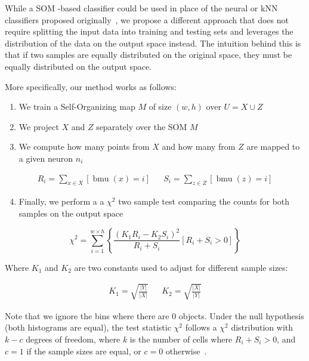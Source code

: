 While a \gls{SOM} -based classifier could be used in place of the neural or \gls{kNN} classifiers proposed
originally~\cite{lopez2016revisiting}, we propose a different approach that does not require
splitting the input data into training and testing sets and leverages the distribution of the
data on the output space instead. The intuition behind this is that if two samples are equally
distributed on the original space, they must be equally distributed on the output space.

More specifically, our method works as follows:

\begin{enumerate}
    \item We train a Self-Organizing map $M$ of size $(w, h)$ over $U = X \cup Z$
    \item We project $X$ and $Z$ separately over the \gls{SOM}  $M$
    \item We compute how many points from $X$ and how many from $Z$ are mapped to a given neuron $n_i$
\end{enumerate}

\begin{align}
    R_i = \sum_{x \in X} [ \operatorname{bmu}(x) = i ] && S_i = \sum_{z \in Z} [ \operatorname{bmu}(z) = i ]
\end{align}

\begin{enumerate}
    \setcounter{enumi}{3}
    \item Finally, we perform a a $\chi^2$ two sample test comparing the counts for both samples
    on the output space
\end{enumerate}

\begin{equation}
    \label{eq:chi2}
    \chi^2 = \sum_{i=1}^{w \times h}{ \left\{ \frac{(K_1 R_i - K_2 S_i)^2}{R_i + S_i} [ R_i + S_i > 0 ] \right\}}
\end{equation}

Where $K_1$ and $K_2$ are two constants used to adjust for different sample sizes:

\begin{align}
    \label{eq:k1k2} K_1 = \sqrt{\frac{|Y|}{|X|}} && K_2 = \sqrt{\frac{|X|}{|Y|}}
\end{align}

Note that we ignore the bins where there are 0 objects. Under the null hypothesis
(both histograms are equal), the test statistic $\chi^2$ follows a $\chi^2$
distribution with $k - c$ degrees of freedom, where $k$ is the number of cells
where ${R_i + S_i > 0}$, and $c = 1$ if the sample sizes are equal, or $c = 0$
otherwise~\cite{press1993numerical}.

